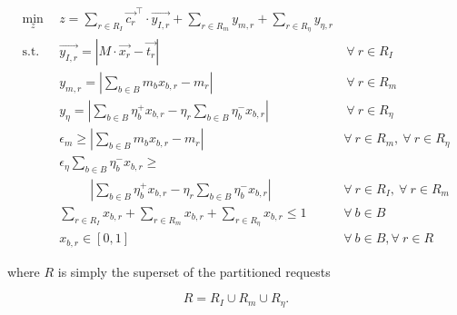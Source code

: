 \begin{subequations}\label{eqs:roap}
  \begin{align}
    \min_{z} \:\: & 
    z = \sum_{r \in R_I} \vec{c_{r}}^{\top} \cdot \vec{y_{I,r}}
    + \sum_{r \in R_m} y_{m,r} + \sum_{r \in R_\eta} y_{\eta,r}
    & \label{eqs:roap_obj} \\
    \text{s.t.} \:\: &
    \vec{y_{I,r}} = \left| M \cdot \vec{x_{r}}  - \vec{t_{r}} \right|
    &
    \: \forall \: r \in R_I \label{eqs:roap_iso_y} \\
    &
    y_{m,r} = \left| \sum_{b \in B} m_{b} x_{b,r} - m_{r} \right| 
    &
    \: \forall \: r \in R_m \label{eqs:roap_mass_y} \\
    &
    y_{\eta} = \left| \sum_{b \in B} \eta_{b}^{+} x_{b,r}
    - \eta_{r} \sum_{b \in B} \eta_{b}^{-} x_{b,r} \right|
    &
    \: \forall \: r \in R_\eta \label{eqs:roap_eta_y} \\
    &
    \epsilon_{m} \geq \left| \sum_{b \in B} m_{b} x_{b,r} - m_{r} \right|
    & 
    \forall \: r \in R_m, \: \forall \: r \in R_{\eta} \label{eqs:roap_mass} \\
    &
    \epsilon_{\eta} \sum_{b \in B} \eta_{b}^{-} x_{b,r} \geq 
    & \nonumber \\ 
    & 
    \:\:\:\:\:\:\:\:\:\:\:  %
    \left| \sum_{b \in B} \eta_{b}^{+} x_{b,r} - 
    \eta_{r} \sum_{b \in B} \eta_{b}^{-} x_{b,r} \right|
    &
    \forall \: r \in R_{I}, \: \forall \: r \in R_{m} \label{eqs:roap_eta} \\
    &
    \sum_{r \in R_{I}} x_{b,r} +
    \sum_{r \in R_{m}} x_{b,r} + 
    \sum_{r \in R_{\eta}} x_{b,r} \leq 1
    & 
    \forall \: b \in B \label{eqs:roap_conserv} \\
    &
    x_{b,r} \in \left[ 0, 1 \right]
    & 
    \forall \: b \in B, 
    \forall \: r \in R  \label{eqs:roap_x}
  \end{align}
\end{subequations}

where $R$ is simply the superset of the partitioned requests

\begin{equation*}
  R = R_{I} \cup R_{m} \cup R_{\eta}.
\end{equation*}
